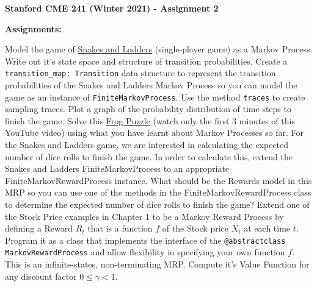 \documentclass[12pt]{exam}
\begin{document}
\begin{center}
{\large {\bf Stanford CME 241 (Winter 2021) - Assignment 2}}
\end{center}
 
{\large{\bf Assignments:}}
\begin{questions}
\question Model the game of \href{https://toytheater.com/snakes-and-ladders/}{Snakes and Ladders} (single-player game) as a Markov Process. Write out it's state space and structure of transition probabilities.
\question Create a \lstinline{transition_map: Transition} data structure to represent the transition probabilities of the Snakes and Ladders Markov Process so you can model the game as an instance of \lstinline{FiniteMarkovProcess}. Use the method \lstinline{traces} to create sampling traces. Plot a graph of the probability distribution of time steps to finish the game.
\question Solve this \href{https://www.youtube.com/watch?v=ZLTyX4zL2Fc}{Frog Puzzle} (watch only the first 3 minutes of this YouTube video) using what you have learnt about Markov Processes so far.
\question For the Snakes and Ladders game, we are interested in calculating the expected number of dice rolls to finish the game. In order to calculate this, extend the Snakes and Ladders FiniteMarkovProcess to an appropriate FiniteMarkovRewardProcess instance. What should be the Rewards model in this MRP so you can use one of the methods in the FiniteMarkovRewardProcess class to determine the expected number of dice rolls to finish the game?
 Extend one of the Stock Price examples in Chapter 1 to be a Markov Reward Process by defining a Reward $R_t$ that is a function $f$ of the Stock price $X_t$ at each time $t$. Program it as a class that implements the interface of the \lstinline{@abstractclass MarkovRewardProcess} and allow flexibility in specifying your own function $f$. This is an infinite-states, non-terminating MRP. Compute it's Value Function for any discount factor $0 \leq \gamma < 1$.
\end{questions}
\end{document}
